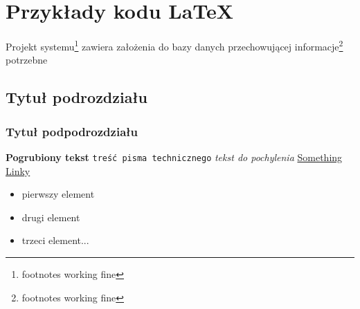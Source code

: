 \documentclass[12px]{article}
\begin{document}
\maketitle

\tableofcontents

\newpage



























\section{Przykłady kodu LaTeX}
Projekt systemu\footnote{footnotes working fine} zawiera założenia do bazy danych przechowującej informacje\footnote{footnotes working fine} potrzebne

\subsection{Tytuł podrozdziału} 
\subsubsection{Tytuł podpodrozdziału}
\textbf{Pogrubiony tekst}
\texttt{treść pisma technicznego}
\textsl{tekst do pochylenia}
\href{http://www.sharelatex.com}{Something 
Linky}
 
\begin{itemize}
\item pierwszy element
\item drugi element
\item trzeci element...
\end{itemize}
\end{document}
